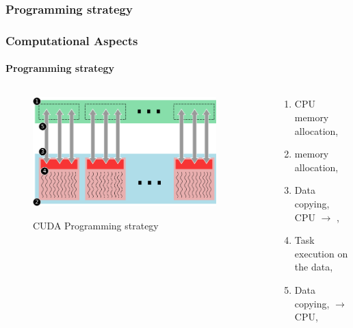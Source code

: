 \subsubsection{Programming strategy}
\begin{frame}
    \frametitle{Computational Aspects}
    \framesubtitle{Programming strategy}

    \begin{columns}
        \begin{column}{0.5\textwidth}
            \begin{figure}
                \captionsetup{singlelinecheck=off}
                \centering
                \includegraphics[width=0.9\textwidth]{img/cuda-strategy}
                \label{fig:estrategia}
                \caption{CUDA Programming strategy}
            \end{figure}
        \end{column}
        \begin{column}{0.5\textwidth}
             \begin{enumerate}
                 \item CPU memory allocation,
                 \item {} memory allocation,
                 \item Data copying,  CPU $\rightarrow$ ,
                 \item Task execution on the data,
                 \item Data copying,  $\rightarrow$ CPU,
             \end{enumerate}
        \end{column}
    \end{columns}
\end{frame}
